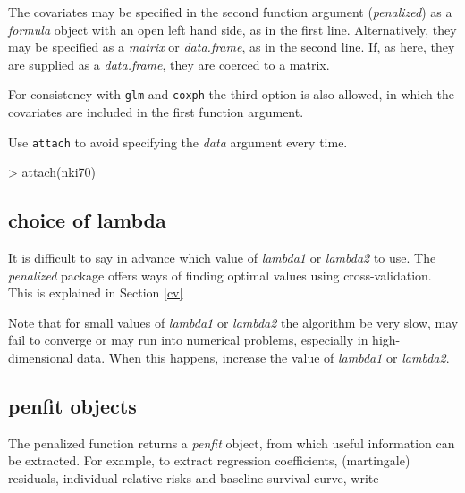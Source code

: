 \documentclass[a4paper]{article}
\newcommand{\Rfunction}[1]{{\texttt{#1}}}
\newcommand{\Rpackage}[1]{{\textit{#1}}}
\newcommand{\Rclass}[1]{{\textit{#1}}}
\newcommand{\Rfunarg}[1]{{\textit{#1}}}
\begin{document}
The covariates may be specified in the second function argument (\Rfunarg{penalized}) as a \Rclass{formula} object with an open left hand side, as in the first line. Alternatively, they may be specified as a \Rclass{matrix} or \Rclass{data.frame}, as in the second line. If, as here, they are supplied as a \Rclass{data.frame}, they are coerced to a matrix.

For consistency with \Rfunction{glm} and \Rfunction{coxph} the third option is also allowed, in which the covariates are included in the first function argument.

Use \Rfunction{attach} to avoid specifying the \Rfunarg{data} argument every time.

\begin{Schunk}
\begin{Sinput}
> attach(nki70)
\end{Sinput}
\end{Schunk}

\subsection{choice of lambda}

It is difficult to say in advance which value of \Rfunarg{lambda1} or \Rfunarg{lambda2} to use. The \Rpackage{penalized} package offers ways of finding optimal values using cross-validation. This is explained in Section \ref{cv}

Note that for small values of \Rfunarg{lambda1} or \Rfunarg{lambda2} the algorithm be very slow, may fail to converge or may run into numerical problems, especially in high-dimensional data. When this happens, increase the value of \Rfunarg{lambda1} or \Rfunarg{lambda2}.


\subsection{penfit objects}

The penalized function returns a \Rclass{penfit} object, from which useful information can be extracted. For example, to extract regression coefficients, (martingale) residuals, individual relative risks and baseline survival curve, write
\end{document}
